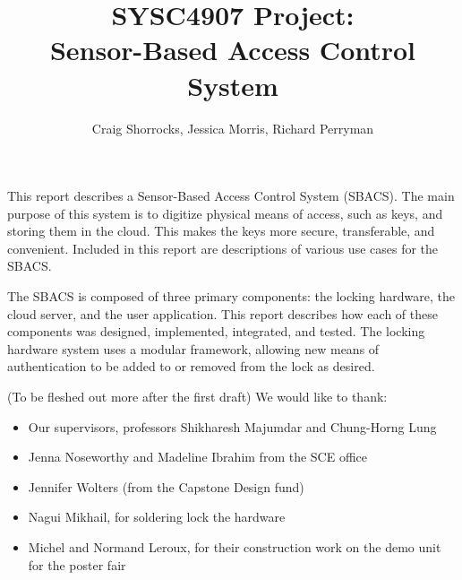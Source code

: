 \documentclass[12pt]{report}
\begin{document}
\title{SYSC4907 Project: \\ Sensor-Based Access Control System}
\author{
    Craig Shorrocks,
    Jessica Morris,
    Richard Perryman
}

\copyrightfalse %

\beforepreface



This report describes a Sensor-Based Access Control System (SBACS). The main purpose of this system is to digitize 
physical means of access, such as keys, and storing them in the cloud. This makes the keys more secure, transferable, 
and convenient. Included in this report are descriptions of various use cases for the SBACS.

The SBACS is composed of three primary components: the locking hardware, the cloud server, and the user application. 
This report describes how each of these components was designed, implemented, integrated, and tested. The locking 
hardware system uses a modular framework, allowing new means of authentication to be added to or removed from the lock 
as desired.


    (To be fleshed out more after the first draft)
    We would like to thank:
    \begin{itemize}
    \item Our supervisors, professors Shikharesh Majumdar and Chung-Horng Lung
    \item Jenna Noseworthy and Madeline Ibrahim from the SCE office
    \item Jennifer Wolters (from the Capstone Design fund)
    \item Nagui Mikhail, for soldering lock the hardware
    \item Michel and Normand Leroux, for their construction work on the demo unit for the poster fair
    \end{itemize}
\end{document}
